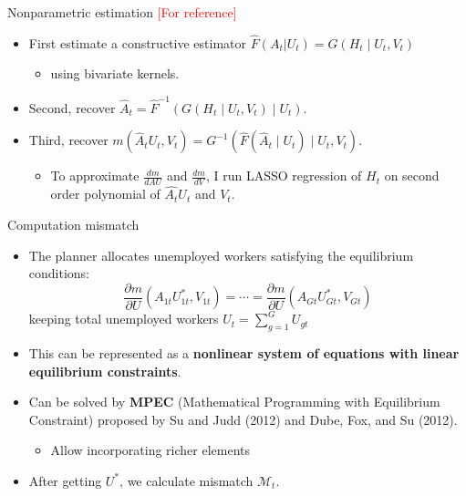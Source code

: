 \documentclass[aspectratio=169]{beamer}
\begin{document}
\begin{frame}{Nonparametric estimation \textcolor{red}{[For reference]}}
    \begin{itemize}
    \item First estimate a constructive estimator $\hat{F}(A_t|U_t)=G\left(H_t \mid U_t, V_t\right)$ 
    \begin{itemize}
        \item using bivariate kernels.
    \end{itemize}
    \item Second, recover $\hat{A}_t=\hat{F}^{-1}\left(G\left(H_t \mid U_t, V_t\right) \mid U_t\right)$.
    \item Third, recover $m\left(\hat{A}_t U_t, V_t\right)=G^{-1}\left(\hat{F}\left(\hat{A}_t \mid U_t\right) \mid U_t, V_t\right)$.
    \begin{itemize}
        \item To approximate $\frac{d m}{d AU}$ and $\frac{d m}{d V}$, I run LASSO regression of $H_{t}$ on second order polynomial of $\hat{A_{t}}U_{t}$ and $V_{t}$.
    \end{itemize}
    
    
    \end{itemize}
\end{frame}

\begin{frame}{Computation mismatch}
    \begin{itemize}
    \item The planner allocates unemployed workers satisfying the equilibrium conditions:
    $$
    \frac{\partial m}{\partial U}\left(A_{1 t} U_{1 t}^*, V_{1 t}\right)=\cdots=\frac{\partial m}{\partial U}\left(A_{G t} U_{G t}^*, V_{G t}\right)
    $$
    keeping total unemployed workers $U_t=\sum_{g=1}^G U_{g t}$
    \item This can be represented as a \textbf{nonlinear system of equations with linear equilibrium constraints}.
    \item Can be solved by \textbf{MPEC} (Mathematical Programming with Equilibrium Constraint) proposed by Su and Judd (2012) and Dube, Fox, and Su (2012).
    \begin{itemize}
        \item Allow incorporating richer elements
    \end{itemize}
    \item After getting $U^*$, we calculate mismatch $\mathcal{M}_t$.
    \end{itemize}
\end{frame}
\end{document}
